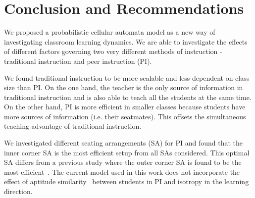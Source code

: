 \chapter{Conclusion and Recommendations}

We proposed a probabilistic cellular automata model as a new way of investigating classroom learning dynamics.
We are able to investigate the effects of different factors governing two very different methods of instruction - traditional instruction and peer instruction (PI).

We found traditional instruction to be more scalable and less dependent on class size than PI.
On the one hand, the teacher is the only source of information in traditional instruction and is also able to teach all the students at the same time.
On the other hand, PI is more efficient in smaller classes because students have more sources of information (i.e. their seatmates). 
This offsets the simultaneous teaching advantage of traditional instruction.

We investigated different seating arrangements (SA) for PI and found that the inner corner SA is the most efficient setup from all SAs considered.
This optimal SA differs from a previous study where the outer corner SA is found to be the most efficient~\cite{roxas2010seating}.
The current model used in this work does not incorporate the effect of aptitude similarity~\cite{smith2009peer} between students in PI and isotropy in the learning direction.

